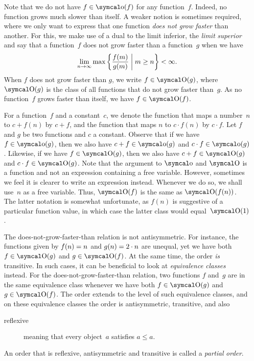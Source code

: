 Note that we do not have $f \in \littleo(f)$ for any function~$f$.
Indeed, no function grows much slower than itself.
A weaker notion is sometimes required, where we only want to express that one function \emph{does not grow faster} than another.
For this, we make use of a dual to the limit inferior, the \emph{limit superior} and say that a function~$f$ does not grow faster than a function~$g$ when we have
\begin{equation*}
  \lim_{n \to \infty} \max \left\{\frac{f(m)}{g(m)} \st[\middle] m \ge n\right\} < \infty.
\end{equation*}
When $f$ does not grow faster than $g$, we write $f \in \bigO(g)$, where $\bigO(g)$ is the class of all functions that do not grow faster than~$g$.
As no function~$f$ grows faster than itself, we have $f \in \bigO(f)$.

For a function~$f$ and a constant~$c$, we denote the function that maps a number~$n$ to $c + f(n)$ by $c + f$, and the function that maps $n$ to $c \cdot f(n)$ by $c \cdot f$.
Let $f$ and $g$ be two functions and $c$ a constant.
Observe that if we have $f \in \littleo(g)$, then we also have $c + f \in \littleo(g)$ and $c \cdot f \in \littleo(g)$.
Likewise, if we have $f \in \bigO(g)$, then we also have $c + f \in \bigO(g)$ and $c \cdot f \in \bigO(g)$.
Note that the argument to $\littleo$ and $\bigO$ is a function and not an expression containing a free variable.
However, sometimes we feel it is clearer to write an expression instead.
Whenever we do so, we shall use~$n$ as a free variable.
Thus, $\bigO(f)$ is the same as $\bigO(f(n))$.
The latter notation is somewhat unfortunate, as $f(n)$ is suggestive of a particular function value, in which case the latter class would equal~$\bigO(1)$.

The does-not-grow-faster-than relation is not antisymmetric.
For instance, the functions given by $f(n) \deq n$ and $g(n) \deq 2 \cdot n$ are unequal, yet we have both $f \in \bigO(g)$ and $g \in \bigO(f)$.
At the same time, the order \emph{is} transitive.
In such cases, it can be beneficial to look at \emph{equivalence classes} instead.
For the does-not-grow-faster-than relation, two functions $f$ and~$g$ are in the same equivalence class whenever we have both $f \in \bigO(g)$ and $g \in \bigO(f)$.
The order extends to the level of such equivalence classes, and on these equivalence classes the order is antisymmetric, transitive, and also
\begin{description}
\item[reflexive] meaning that every object~$a$ satisfies $a \le a$.
\end{description}
An order that is reflexive, antisymmetric and transitive is called a \emph{partial order}.

